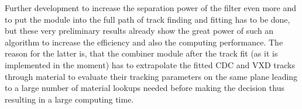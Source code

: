 
Further development to increase the separation power of the filter even more and to put the module into the full path of track finding and fitting has to be done, but these very preliminary results already show the great power of such an algorithm to increase the efficiency and also the computing performance. The reason for the latter is, that the combiner module after the track fit (as it is implemented in the moment) has to extrapolate the fitted CDC and VXD tracks through material to evaluate their tracking parameters on the same plane leading to a large number of material lookups needed before making the decision thus resulting in a large computing time.

